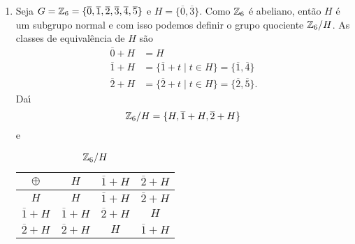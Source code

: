 \begin{exemplos}
\begin{enumerate}[label={\arabic*})]
        \item Seja $G = \mathbb{Z}_6 = \{\overline{0}, \overline{1}, \overline{2}, \overline{3}, \overline{4}, \overline{5}\}$ e $H = \{\overline{0}, \overline{3}\}$. Como $\mathbb{Z}_6$ \'e abeliano, ent\~ao $H$ \'e um subgrupo normal e com isso podemos definir o grupo quociente $\mathbb{Z}_6/H$. As classes de equival\^encia de $H$ s\~ao
        \begin{align*}
        	\overline{0} + H &= H\\
        	\overline{1} + H &= \{\overline{1} + t \mid t \in H\} = \{\overline{1}, \overline{4}\}\\
        	\overline{2} + H &= \{\overline{2} + t \mid t \in H\} = \{\overline{2}, \overline{5}\}.
        \end{align*}
        Da{\'\i}
        \[
        	\mathbb{Z}_6/H = \{H, \overline{1} + H, \overline{2} + H\}
        \]
        e
        \begin{center}
        	\begin{table}[htp]
        		\centering
        		\caption{$\mathbb{Z}_6/H$}
        		\begin{tabular}{|c|c|c|c|}
        			\hline
        			$\oplus$ & $H$ & $\overline{1} + H$ & $\overline{2} + H$\\
        			\hline
        			$H$ & $H$ & $\overline{1} + H$ & $\overline{2} + H$\\
        			\hline
        			$\overline{1} + H$ & $\overline{1} + H$ & $\overline{2} + H$ & $H$\\
        			\hline
        			$\overline{2} + H$ & $\overline{2} + H$ & $H$ & $\overline{1} + H$\\
        			\hline
        		\end{tabular}
        	\end{table}
        \end{center}



\end{enumerate}
\end{exemplos}
